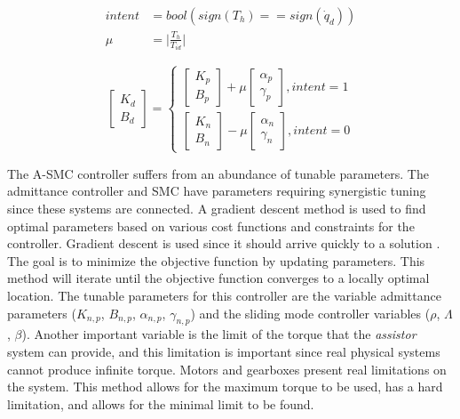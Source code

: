 \begin{equation}
    \begin{aligned}
         intent &= bool ( sign(T_h) == sign(\dot{q}_d) ) \\
         \mu &= \Big|\frac{T_h}{T_{id}} \Big|
    \end{aligned}
    \label{eq:intention}
\end{equation}



\begin{equation}
    \begin{bmatrix} K_d \\ B_d \end{bmatrix} = \begin{cases}
        \begin{bmatrix} K_{p} \\ B_{p} \end{bmatrix} + \mu  \begin{bmatrix} \alpha_p  \\ \gamma_p \end{bmatrix}, intent = 1 \\
        \begin{bmatrix} K_{n} \\ B_{n} \end{bmatrix} - \mu  \begin{bmatrix} \alpha_n  \\ \gamma_n \end{bmatrix}, intent = 0
  \end{cases}
  \label{eq:varible}
\end{equation}


The A-SMC controller suffers from an abundance of tunable parameters. The admittance controller and SMC have parameters requiring synergistic tuning since these systems are connected.  A gradient descent method is used to find optimal parameters based on various cost functions and constraints for the controller.  Gradient descent is used since it should arrive quickly to a solution  \cite{piltan2012performance} \cite{wang1996course}. The goal is to minimize the objective function by updating parameters. This method will iterate until the objective function converges to a locally optimal location. The tunable parameters for this controller are the variable admittance parameters ($K_{n,p}$, $B_{n,p}$, $\alpha_{n,p}$, $\gamma_{n,p}$) and the sliding mode controller variables ($\rho$, $\Lambda$, $\beta$).  Another important variable is the limit of the torque that the \textit{assistor} system can provide, and this limitation is important since real physical systems cannot produce infinite torque. Motors and gearboxes present real limitations on the system. This method allows for the maximum torque to be used, has a hard limitation, and allows for the minimal limit to be found.


